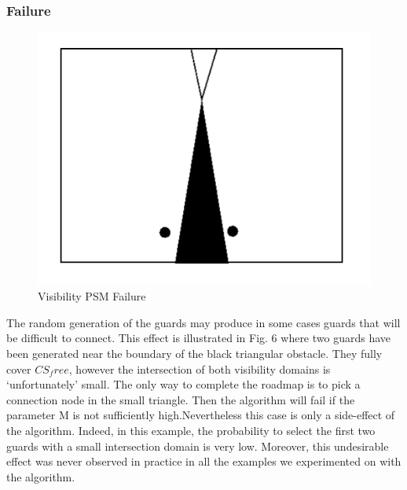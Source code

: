 \documentclass[11pt]{article}
\begin{document}
\subsubsection{Failure}
\begin{figure}[h]
\includegraphics{visibility_psm_failure}
\centering
\caption{Visibility PSM Failure}
\label{fig:roadmap_alg}
\end{figure}
The random generation of the guards may produce in some cases guards that will
be difficult to connect. This effect is illustrated in Fig. 6 where two guards have
been generated near the boundary of the black triangular obstacle. They fully cover
$CS_free$, however the intersection of both visibility domains is ‘unfortunately’ small.
The only way to complete the roadmap is to pick a connection node in the small
triangle. Then the algorithm will fail if the parameter M is not sufficiently high.Nevertheless this case is only a side-effect of the algorithm. Indeed, in this example,
the probability to select the first two guards with a small intersection domain is very
low. Moreover, this undesirable effect was never observed in practice in all the
examples we experimented on with the algorithm.
\end{document}
